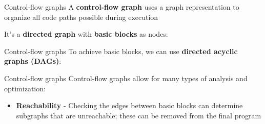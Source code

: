 \documentclass[../index.tex]{subfiles}
\begin{document}
\renewcommand{\currenttitle}{Control-flow graphs}
\begin{frame}[fragile]{\currenttitle}
  A \textbf{control-flow graph} uses a graph representation to organize all
  code paths possible during execution

  It's a \textbf{directed graph} with \textbf{basic blocks} as nodes:

  \begin{tikzpicture}
  \end{tikzpicture}
\end{frame}

\begin{frame}[fragile]{\currenttitle}
  To achieve basic blocks, we can use \textbf{directed acyclic graphs (DAGs)}:

  \newcommand{\lbl}[1]{\texttt{\small\bfseries #1}}
\end{frame}

\begin{frame}[fragile]{\currenttitle}
  Control-flow graphs allow for many types of analysis and optimization:

  \begin{itemize}
    \item \textbf{Reachability} - Checking the edges between basic blocks can
      determine subgraphs that are unreachable; these can be removed from the
      final program
  \end{itemize}
\end{frame}
  
\end{document}
